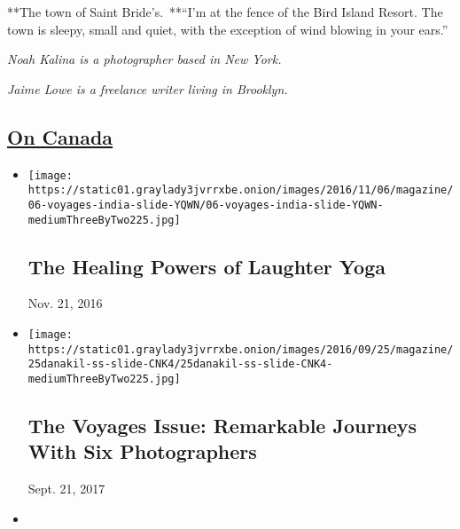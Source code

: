 **The town of Saint Bride's.~**``I'm at the fence of the Bird Island
Resort. The town is sleepy, small and quiet, with the exception of wind
blowing in your ears.''

\emph{Noah Kalina is a photographer based in New York.}

\emph{Jaime Lowe is a freelance writer living in Brooklyn.}

\hypertarget{on-canada}{%
\subsection{\texorpdfstring{\href{https://www.nytimes3xbfgragh.onion/spotlight/experience-on-canada}{On
Canada}}{On Canada}}\label{on-canada}}

\begin{itemize}
\item
  \href{https://www.nytimes3xbfgragh.onion/interactive/2016/11/06/magazine/voyages-laughter-yoga-bangalore.html}{}

  \texttt{[image: https://static01.graylady3jvrrxbe.onion/images/2016/11/06/magazine/06-voyages-india-slide-YQWN/06-voyages-india-slide-YQWN-mediumThreeByTwo225.jpg]}

  \hypertarget{the-healing-powers-of-laughter-yoga}{%
  \subsection{The Healing Powers of Laughter
  Yoga}\label{the-healing-powers-of-laughter-yoga}}

  Nov. 21, 2016
\item
  \href{https://www.nytimes3xbfgragh.onion/interactive/2016/09/25/magazine/the-voyages-issue.html}{}

  \texttt{[image: https://static01.graylady3jvrrxbe.onion/images/2016/09/25/magazine/25danakil-ss-slide-CNK4/25danakil-ss-slide-CNK4-mediumThreeByTwo225.jpg]}

  \hypertarget{the-voyages-issue-remarkable-journeys-with-six-photographers}{%
  \subsection{The Voyages Issue: Remarkable Journeys With Six
  Photographers}\label{the-voyages-issue-remarkable-journeys-with-six-photographers}}

  Sept. 21, 2017
\item
  \href{https://www.nytimes3xbfgragh.onion/interactive/2016/09/11/magazine/voyages-dakar-surfing.html}{}


\end{itemize}
